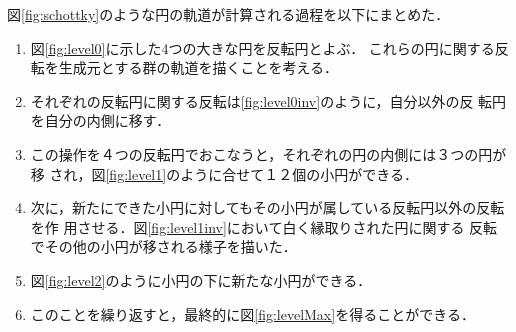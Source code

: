 図\ref{fig:schottky}のような円の軌道が計算される過程を以下にまとめた．
\begin{enumerate}
 \item 図\ref{fig:level0}に示した4つの大きな円を反転円とよぶ．
       これらの円に関する反転を生成元とする群の軌道を描くことを考える．
 \item それぞれの反転円に関する反転は\ref{fig:level0inv}のように，自分以外の反
       転円を自分の内側に移す．
 \item この操作を４つの反転円でおこなうと，それぞれの円の内側には３つの円が移
       され，図\ref{fig:level1}のように合せて１２個の小円ができる．
 \item 次に，新たにできた小円に対してもその小円が属している反転円以外の反転を作
       用させる．図\ref{fig:level1inv}において白く縁取りされた円に関する
       反転でその他の小円が移される様子を描いた．
 \item 図\ref{fig:level2}のように小円の下に新たな小円ができる．
 \item このことを繰り返すと，最終的に図\ref{fig:levelMax}を得ることができる．
\end{enumerate}

